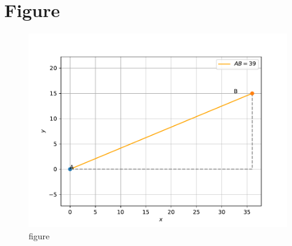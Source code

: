 \documentclass[journal,12pt,twocolumn]{IEEEtran}
\begin{document}
\section{\textbf{Figure}}
\begin{figure}[!h]
    \centering
\includegraphics[width=\columnwidth]{vec.pdf}
\captionsetup{labelformat=empty}
\caption{figure}
\label{fig}
\end{figure}
\end{document}
